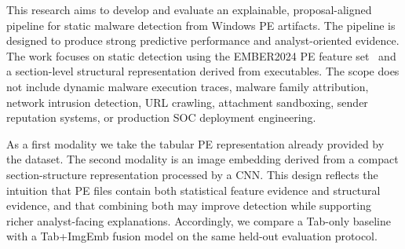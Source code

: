 \documentclass[conference]{IEEEtran}
\begin{document}

This research aims to develop and evaluate an explainable, proposal-aligned pipeline for static malware detection from Windows PE artifacts.
The pipeline is designed to produce strong predictive performance and analyst-oriented evidence.
The work focuses on static detection using the EMBER2024 PE feature set~\cite{JMGPR2024} and a section-level structural representation derived from executables.
The scope does not include dynamic malware execution traces, malware family attribution, network intrusion detection, URL crawling, attachment sandboxing, sender reputation systems, or production SOC deployment engineering.


As a first modality we take the tabular PE representation already provided by the dataset.
The second modality is an image embedding derived from a compact section-structure representation processed by a CNN.
This design reflects the intuition that PE files contain both statistical feature evidence and structural evidence, and that combining both may improve detection while supporting richer analyst-facing explanations.
Accordingly, we compare a Tab-only baseline with a Tab+ImgEmb fusion model on the same held-out evaluation protocol.

% 
% 
% 
% 
\end{document}
